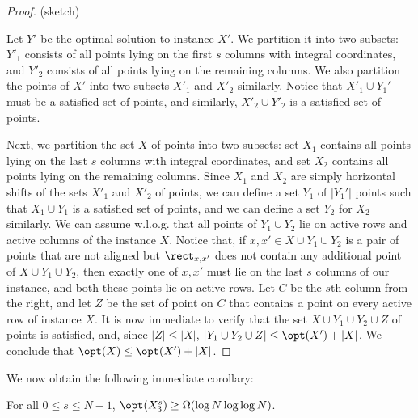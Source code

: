\begin{proof}
	(sketch)
	
	Let $Y'$ be the optimal solution to instance $X'$. We partition it into two subsets: $Y'_1$ consists of all points lying on the first $s$ columns with integral coordinates, and $Y'_2$ consists of all points lying on the remaining columns. We also partition the points of $X'$ into two subsets $X'_1$ and $X'_2$ similarly.  Notice that $X'_1\cup Y_1'$ must be a satisfied set of points, and similarly, $X'_2\cup Y'_2$ is a satisfied set of points.
	
	Next, we partition the set $X$ of points into two subsets: set $X_1$ contains all points lying on the last $s$ columns with integral coordinates, and set $X_2$ contains all points lying on the remaining columns. Since $X_1$ and $X_2$ are simply horizontal shifts of the sets $X'_1$ and $X'_2$ of points, we can define a set $Y_1$ of $|Y_1'|$ points such that $X_1\cup Y_1$ is a satisfied set of points, and we can define a set $Y_2$ for $X_2$ similarly. We can assume w.l.o.g. that all points of $Y_1\cup Y_2$ lie on active rows and active columns of the instance $X$. Notice that, if $x,x'\in X\cup Y_1\cup Y_2$ is a pair of points that are not aligned but $\rect_{x,x'}$ does not contain any additional point of $X\cup Y_1\cup Y_2$, then exactly one of $x,x'$ must lie on the last $s$ columns of our instance, and both these points lie on active rows. Let $C$ be the $s$th column from the right, and let $Z$ be the set of point on $C$ that contains a point on every active row of instance $X$. It is now immediate to verify that the set $X\cup Y_1\cup Y_2\cup Z$ of points is satisfied, and, since $|Z|\leq |X|$, $|Y_1\cup Y_2\cup Z|\leq \opt(X')+|X|$. We conclude that $\opt(X)\leq \opt(X')+|X|$.
\end{proof}
	
We now obtain the following immediate corollary:

\begin{corollary}\label{cor: large solution cost for shifted instance}
For all $0\leq s\leq N-1$, $\opt(X_3^s)\geq \Omega(\log N\log\log N)$.
\end{corollary}


